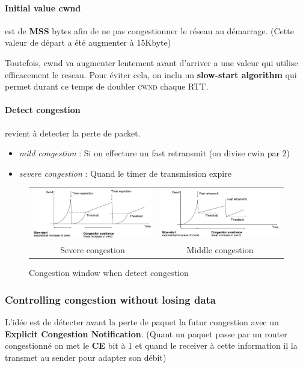 \paragraph{Initial value cwnd}
est de \textbf{MSS} bytes afin de ne pas congestionner le réseau au démarrage.
(Cette valeur de départ a été augmenter à 15Kbyte)


Toutefois, cwnd va augmenter lentement avant d'arriver a une valeur qui utilise efficacement le
reseau. Pour éviter cela, on inclu un \textbf{slow-start algorithm} qui permet durant ce temps
de doubler \textsc{cwnd} chaque RTT.

\paragraph{Detect congestion} revient à detecter la perte de packet.
\begin{itemize}
    \item \textit{mild congestion} : Si on effecture un fast retransmit (on divise cwin par 2)
    \item \textit{severe congestion} : Quand le timer de transmission expire
\end{itemize}

\begin{figure}[h]
    \centering
    \begin{tabular}{m{8cm}m{8cm}}
    \includegraphics[width=8cm]{severecongestion.png} &
    \includegraphics[width=8cm]{midlecongestion.png} \\
    \multicolumn{1}{c}{Severe congestion} & \multicolumn{1}{c}{Middle congestion }
\end{tabular}
    \caption{Congestion window when detect congestion}
\end{figure}

\subsubsection{Controlling congestion without losing data}
L'idée est de détecter avant la perte de paquet la futur congestion avec un
\textbf{Explicit Congestion Notification}. (Quant un paquet passe par un router
congestionné on met le \textbf{CE} bit à 1 et quand le receiver à cette information il la
transmet au sender pour adapter son débit)

